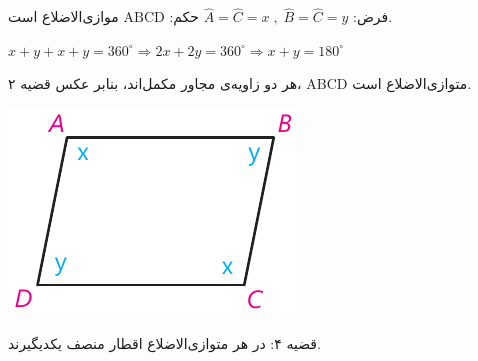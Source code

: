 \documentclass[12pt, a4paper]{book}
\begin{document}
\begin{minipage}{.75\textwidth}
 فرض: 
	$
		\widehat{A} = \widehat{C} = x \; , \; \widehat{B} = \widehat{C} = y
	$
	\hfill حکم:
	$ 
		\mathrm{ABCD}
	$ موازی‌الاضلاع است.
	\begin{flushleft}
		$ 
			x+y +x +y = 360^{\circ} \Rightarrow 2x + 2y = 360^{\circ} \Rightarrow x+y =180^{\circ}
		$
	\end{flushleft}
		هر دو زاویه‌ی مجاور مکمل‌اند،  بنابر عکس قضیه‌ ۲، ABCD متوازی‌الاضلاع است.
\end{minipage}
\begin{minipage}{.25\textwidth}
	\begin{flushleft}
		\includegraphics[scale=0.8]{"Shapes/Fasl - 3/Dars 1/qazie 3 ax.pdf"}
	\end{flushleft}
\end{minipage}

{\semibold قضیه ۴}: در هر متوازی‌الاضلاع اقطار منصف یکدیگیرند.
\end{document}

